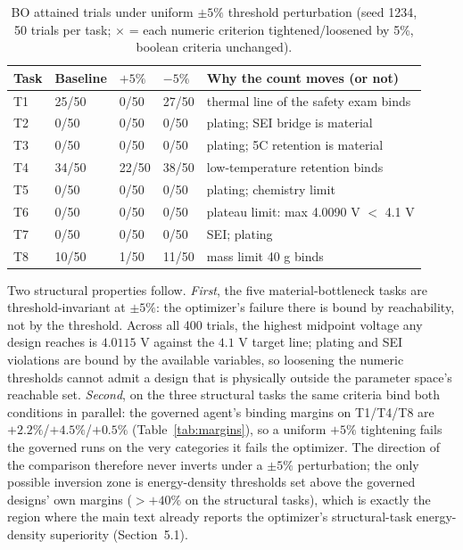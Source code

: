 \documentclass[review,11pt]{elsarticle}
\begin{document}
\begin{table}[!ht]
\centering
\caption{BO attained trials under uniform $\pm 5\%$ threshold
perturbation (seed 1234, 50 trials per task; $\times$ = each numeric
criterion tightened/loosened by 5\%, boolean criteria unchanged).}
\label{supp:tab:bosens}
\setlength{\tabcolsep}{2.5pt}
\begin{tabular}{p{1.0cm}p{1.5cm}p{1.5cm}p{1.5cm}p{7.3cm}}
\toprule
Task & Baseline & $+5\%$ & $-5\%$ & Why the count moves (or not) \\
\midrule
T1 & 25/50 & 0/50 & 27/50 & thermal line of the safety exam binds \\
T2 & 0/50 & 0/50 & 0/50 & plating; SEI bridge is material \\
T3 & 0/50 & 0/50 & 0/50 & plating; 5C retention is material \\
T4 & 34/50 & 22/50 & 38/50 & low-temperature retention binds \\
T5 & 0/50 & 0/50 & 0/50 & plating; chemistry limit \\
T6 & 0/50 & 0/50 & 0/50 & plateau limit: max 4.0090 V $<$ 4.1 V \\
T7 & 0/50 & 0/50 & 0/50 & SEI; plating \\
T8 & 10/50 & 1/50 & 11/50 & mass limit 40 g binds \\
\bottomrule
\end{tabular}
\end{table}

Two structural properties follow. \emph{First}, the five
material-bottleneck tasks are threshold-invariant at $\pm 5\%$: the
optimizer's failure there is bound by reachability, not by the threshold. Across all
400 trials, the highest midpoint voltage any design reaches is $4.0115$ V
against the $4.1$ V target line; plating and SEI violations are
bound by the available variables, so loosening the numeric thresholds cannot admit a design that
is physically outside the parameter space's reachable set. \emph{Second},
on the three structural tasks the same criteria bind both conditions in
parallel: the governed agent's binding margins on T1/T4/T8 are
$+2.2\%$/$+4.5\%$/$+0.5\%$ (Table~\ref{tab:margins}), so a uniform $+5\%$
tightening fails the governed runs on the very categories it fails the
optimizer. The direction of the comparison therefore never inverts under a
$\pm 5\%$ perturbation; the only possible inversion zone is
energy-density thresholds set above the governed designs' own margins
($>+40\%$ on the structural tasks), which is exactly the region where the
main text already reports the optimizer's structural-task energy-density
superiority (Section~5.1).



\end{document}
